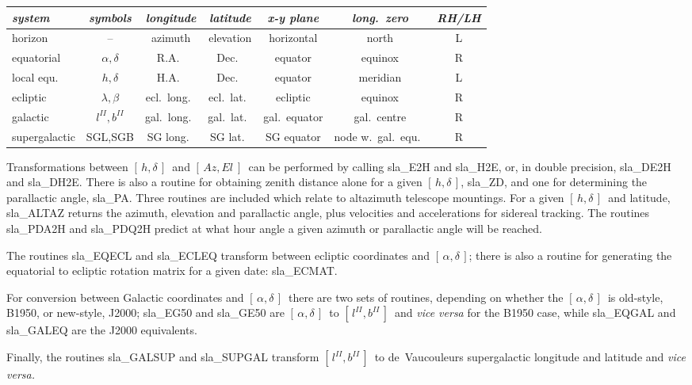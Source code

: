 \documentclass[11pt,twoside]{article}
\newcommand{\radec}     {$[\,\alpha,\delta\,]$}
\newcommand{\hadec}     {$[\,h,\delta\,]$}
\newcommand{\azel}      {$[\,Az,El~]$}
\newcommand{\gal}       {$[\,l^{I\!I},b^{I\!I}\,]$}
\begin{document}
\begin{center}
\begin{tabular}{|l|c|c|c|c|c|c|} \hline
{\it system} & {\it symbols} & {\it longitude} & {\it latitude} &
          {\it x-y plane} & {\it long.\ zero} & {\it RH/LH}
\\ \hline \hline
horizon & -- & azimuth & elevation & horizontal & north & L
\\ \hline
equatorial & $\alpha,\delta$ & R.A.\ & Dec.\ & equator & equinox & R
\\ \hline
local equ.\ & $h,\delta$ & H.A.\ & Dec.\ & equator & meridian & L
\\ \hline
ecliptic & $\lambda,\beta$ & ecl.\ long.\ & ecl.\ lat.\ &
                                       ecliptic & equinox & R
\\ \hline
galactic & $l^{I\!I},b^{I\!I}$ & gal.\ long.\ & gal.\ lat.\ &
                                       gal.\ equator & gal.\ centre & R
\\ \hline
supergalactic & SGL,SGB & SG long.\ & SG lat.\ &
                                       SG equator & node w.\ gal.\ equ.\ & R
\\ \hline
\end{tabular}
\end{center}
Transformations between \hadec\ and \azel\ can be performed by
calling
sla\_E2H
and
sla\_H2E,
or, in double precision,
sla\_DE2H
and
sla\_DH2E.
There is also a routine for obtaining
zenith distance alone for a given \hadec,
sla\_ZD,
and one for determining the parallactic angle,
sla\_PA.
Three routines are included which relate to altazimuth telescope
mountings.  For a given \hadec\ and latitude,
sla\_ALTAZ
returns the azimuth, elevation and parallactic angle, plus
velocities and accelerations for sidereal tracking.
The routines
sla\_PDA2H
and
sla\_PDQ2H
predict at what hour angle a given azimuth or
parallactic angle will be reached.

The routines
sla\_EQECL
and
sla\_ECLEQ
transform between ecliptic
coordinates and \radec\/; there is also a routine for generating the
equatorial to ecliptic rotation matrix for a given date:
sla\_ECMAT.

For conversion between Galactic coordinates and \radec\ there are
two sets of routines, depending on whether the \radec\ is
old-style, B1950, or new-style, J2000;
sla\_EG50
and
sla\_GE50
are \radec\ to \gal\ and {\it vice versa}\/ for the B1950 case, while
sla\_EQGAL
and
sla\_GALEQ
are the J2000 equivalents.

Finally, the routines
sla\_GALSUP
and
sla\_SUPGAL
transform \gal\ to de~Vaucouleurs supergalactic longitude and latitude
and {\it vice versa.}
\end{document}
